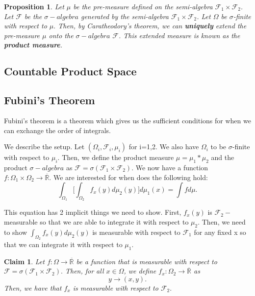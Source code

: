 \documentclass[twoside]{article}
\newtheorem{proposition}[theorem]{Proposition}
\newtheorem{claim}[theorem]{Claim}
\newcommand{\sigmalgebra}{\mathcal{F}}
\newcommand{\sa}{\sigma-algebra}
\newcommand{\real}{\mathbb{R}}
\begin{document}
\begin{proposition}Let $\mu$ be the pre-measure defined on the semi-algebra $\sigmalgebra_1 \times \sigmalgebra_2$. Let $\sigmalgebra$ be the $\sa$ generated by the semi-algebra $\sigmalgebra_1 \times \sigmalgebra_2$. Let $\Omega$ be $\sigma$-finite with respect to $\mu.$ Then, by Caratheodory's theorem, we can \textbf{uniquely} extend the pre-measure $\mu$ onto the $\sa$ $\sigmalgebra$. This extended measure is known as the \textbf{product measure}.
\end{proposition}


\subsection{Countable Product Space}

\subsection{Fubini's Theorem}
Fubini's theorem is a theorem which gives us the sufficient conditions for when we can exchange the order of integrals.

We describe the setup. Let $(\Omega_i, \sigmalgebra_i, \mu_i)$ for i=1,2. We also have $\Omega_i$ to be $\sigma$-finite with respect to $\mu_i.$ Then, we define the product measure $\mu = \mu_1*\mu_2$ and the product $\sa$ as $\sigmalgebra = \sigma(\sigmalgebra_1 \times \sigmalgebra_2).$ We now have a function $f: \Omega_1 \times \Omega_2 \rightarrow \overline{\real}.$ We are interested for when does the following hold:
$$
\int_{\Omega_{1}} \bigg[\int_{\Omega_{2}}f_x(y)d\mu_2(y) \bigg]d\mu_1(x) = \int fd\mu.
$$

This equation has 2 implicit things we need to show. First, $f_x(y)$ is $\sigmalgebra_2-$measurable so that we are able to integrate it with respect to $\mu_2$. Then, we need to show $\int_{\Omega_{2}}f_x(y)d\mu_2(y)$ is measurable with respect to $\sigmalgebra_1$ for any fixed x so that we can integrate it with respect to $\mu_1.$

\begin{claim}Let $f: \Omega \rightarrow \overline{\real}$ be a function that is measurable with respect to $\sigmalgebra = \sigma(\sigmalgebra_1 \times \sigmalgebra_2).$ Then, for all $x \in \Omega$, we define $f_x: \Omega_2 \rightarrow \overline{\real}$ as 
$$
y \rightarrow (x,y).
$$
Then, we have that $f_x$ is measurable with respect to $\sigmalgebra_2.$
\end{claim}
\end{document}
